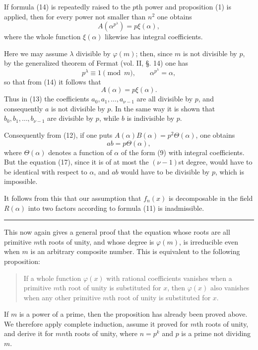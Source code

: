 \documentclass[11pt]{article}
\begin{document}
If formula (14) is repeatedly raised to the $p$th power and proposition (1) is applied, then for every power not smaller than $n^2$ one obtains
\begin{equation}\tag{15}
A(\alpha^{p^\lambda})=p\xi(\alpha),
\end{equation}
where the whole function $\xi(\alpha)$ likewise has integral coefficients.

Here we may assume $\lambda$ divisible by $\varphi(m)$; then, since $m$ is not divisible by $p$, by the generalized theorem of Fermat (vol. II, §. 14) one has
\[
p^\lambda\equiv1 \pmod m,
\qquad
\alpha^{p^\lambda}=\alpha,
\]
so that from (14) it follows that
\begin{equation}\tag{16}
A(\alpha)=p\xi(\alpha).
\end{equation}
Thus in (13) the coefficients $a_0,a_1,\ldots,a_{\nu-1}$ are all divisible by $p$, and consequently $a$ is not divisible by $p$. In the same way it is shown that $b_0,b_1,\ldots,b_{\nu-1}$ are divisible by $p$, while $b$ is indivisible by $p$.

Consequently from (12), if one puts $A(\alpha)B(\alpha)=p^2\Theta(\alpha)$, one obtains
\begin{equation}\tag{17}
ab=p\Theta(\alpha),
\end{equation}
where $\Theta(\alpha)$ denotes a function of $\alpha$ of the form (9) with integral coefficients. But the equation (17), since it is of at most the $(\nu-1)$st degree, would have to be identical with respect to $\alpha$, and $ab$ would have to be divisible by $p$, which is impossible.

It follows from this that our assumption that $f_n(x)$ is decomposable in the field $R(\alpha)$ into two factors according to formula (11) is inadmissible.

\medskip\hrule\medskip

This now again gives a general proof that the equation whose roots are all primitive $m$th roots of unity, and whose degree is $\varphi(m)$, is irreducible even when $m$ is an arbitrary composite number. This is equivalent to the following proposition:

\begin{quote}
If a whole function $\varphi(x)$ with rational coefficients vanishes when a primitive $m$th root of unity is substituted for $x$, then $\varphi(x)$ also vanishes when any other primitive $m$th root of unity is substituted for $x$.
\end{quote}

If $m$ is a power of a prime, then the proposition has already been proved above. We therefore apply complete induction, assume it proved for $m$th roots of unity, and derive it for $mn$th roots of unity, where $n=p^k$ and $p$ is a prime not dividing $m$.
\end{document}
